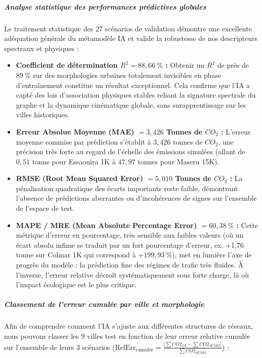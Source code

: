 \documentclass[10pt, a4paper]{article}
\providecommand{\tightlist}{}
\begin{document}
\subparagraph{Analyse statistique des performances prédictives
globales}\label{analyse-statistique-des-performances-pruxe9dictives-globales}

Le traitement statistique des 27 scénarios de validation démontre une
excellente adéquation générale du métamodèle IA et valide la robustesse
de nos descripteurs spectraux et physiques :

\begin{itemize}
\tightlist
\item
  \textbf{Coefficient de détermination \(R^2 = 88,66\ \%\) :} Obtenir un
  \(R^2\) de près de \(89\ \%\) sur des morphologies urbaines totalement
  invisibles en phase d'entraînement constitue un résultat exceptionnel.
  Cela confirme que l'IA a capté des lois d'association physiques
  stables reliant la signature spectrale du graphe et la dynamique
  cinématique globale, sans surapprentissage sur les villes historiques.
\item
  \textbf{Erreur Absolue Moyenne (MAE) \(= 3,426\) Tonnes de \(CO_2\) :}
  L'erreur moyenne commise par prédiction s'établit à \(3,426\) tonnes
  de \(CO_2\), une précision très forte au regard de l'échelle des
  émissions simulées (allant de \(0,51\) tonne pour Essaouira 1K à
  \(47,97\) tonnes pour Maseru 15K).
\item
  \textbf{RMSE (Root Mean Squared Error) \(= 5,010\) Tonnes de \(CO_2\)
  :} La pénalisation quadratique des écarts importants reste faible,
  démontrant l'absence de prédictions aberrantes ou d'incohérences de
  signes sur l'ensemble de l'espace de test.
\item
  \textbf{MAPE / MRE (Mean Absolute Percentage Error) \(= 60,38\ \%\) :}
  Cette métrique d'erreur en pourcentage, très sensible aux faibles
  valeurs (où un écart absolu infime se traduit par un fort pourcentage
  d'erreur, ex. +1,76 tonne sur Colmar 1K qui correspond à
  \(+199,93\ \%\)), met en lumière l'axe de progrès du modèle : la
  prédiction fine des régimes de trafic très fluides. À l'inverse,
  l'erreur relative décroît systématiquement sous forte charge, là où
  l'impact écologique est le plus critique.
\end{itemize}

\subparagraph{Classement de l'erreur cumulée par ville et
morphologie}\label{classement-de-lerreur-cumuluxe9e-par-ville-et-morphologie}

Afin de comprendre comment l'IA s'ajuste aux différentes structures de
réseaux, nous pouvons classer les 9 villes test en fonction de leur
erreur relative cumulée sur l'ensemble de leurs 3 scénarios
(\(\text{RelErr}_{\text{cumulée}} = \frac{|\sum CO2_{IA} - \sum CO2_{SUMO}|}{\sum CO2_{SUMO}}\))
:
\end{document}
